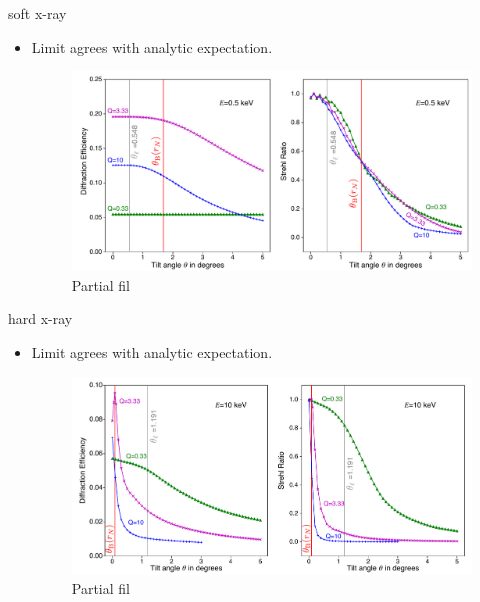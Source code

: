 \documentclass{beamer}
\begin{document}
\begin{frame}{soft x-ray}
	\begin{itemize}
		\item Limit agrees with analytic expectation.
		\begin{center}
			\begin{figure}
				\includegraphics[scale=0.275]{tilt_plot_half}
				\caption{Partial fil}	
			\end{figure}
		\end{center}
	\end{itemize}
\end{frame}

\begin{frame}{hard x-ray}
	\begin{itemize}
		\item Limit agrees with analytic expectation.
		\begin{center}
			\begin{figure}
				\includegraphics[scale=0.275]{tilt_plot_ten}
				\caption{Partial fil}	
			\end{figure}
		\end{center}
	\end{itemize}
\end{frame}
\end{document}

